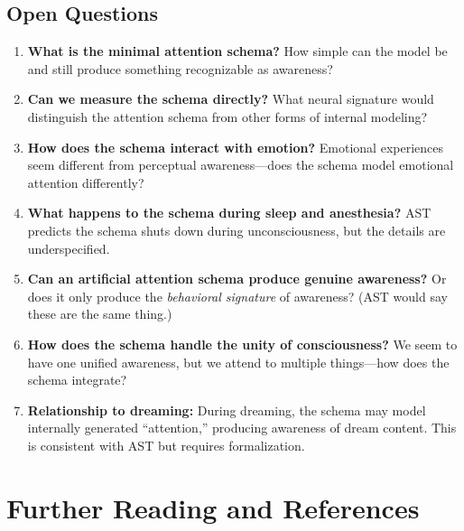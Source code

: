 \documentclass[11pt,a4paper]{report}
\begin{document}
\section{Open Questions}

\begin{enumerate}[leftmargin=2em]
  \item \textbf{What is the minimal attention schema?} How simple can the model be and still produce something recognizable as awareness?
  \item \textbf{Can we measure the schema directly?} What neural signature would distinguish the attention schema from other forms of internal modeling?
  \item \textbf{How does the schema interact with emotion?} Emotional experiences seem different from perceptual awareness---does the schema model emotional attention differently?
  \item \textbf{What happens to the schema during sleep and anesthesia?} AST predicts the schema shuts down during unconsciousness, but the details are underspecified.
  \item \textbf{Can an artificial attention schema produce genuine awareness?} Or does it only produce the \emph{behavioral signature} of awareness? (AST would say these are the same thing.)
  \item \textbf{How does the schema handle the unity of consciousness?} We seem to have one unified awareness, but we attend to multiple things---how does the schema integrate?
  \item \textbf{Relationship to dreaming:} During dreaming, the schema may model internally generated ``attention,'' producing awareness of dream content. This is consistent with AST but requires formalization.
\end{enumerate}


\chapter{Further Reading and References}
\end{document}
